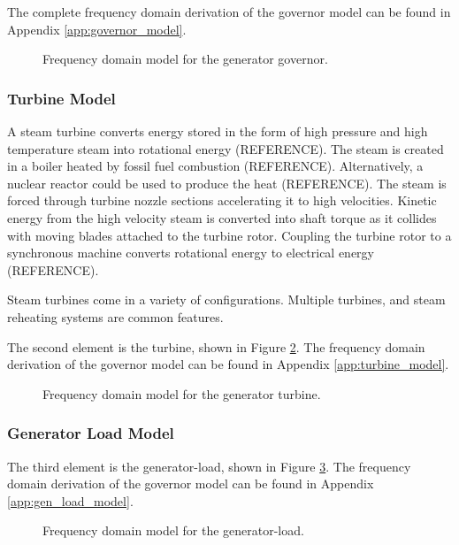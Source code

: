 The complete frequency domain derivation of the governor model can be found in Appendix \ref{app:governor_model}.

\begin{figure}[h]
	\centering
	
	\caption[Frequency domain model for governor]{Frequency domain model for the generator governor.}
	\label{fig:2107_governor_model}
\end{figure}

\subsubsection{Turbine Model}
A steam turbine converts energy stored in the form of high pressure and high temperature steam into rotational energy (REFERENCE). The steam is created in a boiler heated by fossil fuel combustion (REFERENCE). Alternatively, a nuclear reactor could be used to produce the heat (REFERENCE). The steam is forced through turbine nozzle sections accelerating it to high velocities. Kinetic energy from the high velocity steam is converted into shaft torque as it collides with moving blades attached to the turbine rotor. Coupling the turbine rotor to a synchronous machine converts rotational energy to electrical energy (REFERENCE).

Steam turbines come in a variety of configurations. Multiple turbines, and steam reheating systems are common features. 

The second element is the turbine, shown in Figure \ref{fig:2108_turbine_model}. The frequency domain derivation of the governor model can be found in Appendix \ref{app:turbine_model}.

\begin{figure}[h]
	\centering
	
	\caption[Frequency domain model for governor]{Frequency domain model for the generator turbine.}
	\label{fig:2108_turbine_model}
\end{figure}

\subsubsection{Generator Load Model}
The third element is the generator-load, shown in Figure \ref{fig:2109_generator_load_model}. The frequency domain derivation of the governor model can be found in Appendix \ref{app:gen_load_model}.

\begin{figure}[h]
	\centering
	
	\caption[Frequency domain model for generator-load]{Frequency domain model for the generator-load.}
	\label{fig:2109_generator_load_model}
\end{figure}


